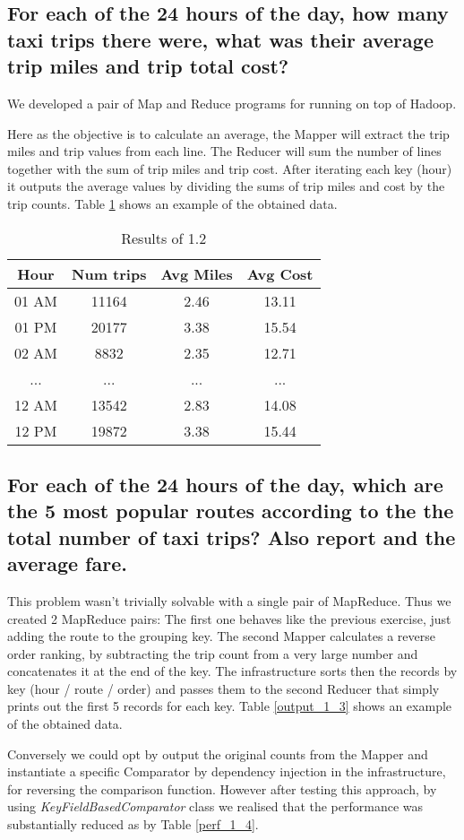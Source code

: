 \documentclass[conference,compsoc]{IEEEtran}
\begin{document}
\subsection{For each of the 24 hours of the day, how many taxi trips there were, what was their average trip miles and trip total cost?}
We developed a pair of Map and Reduce programs for running on top of Hadoop. \par Here as the objective is to calculate an average, the Mapper will extract the trip miles and trip values from each line. The Reducer will sum the number of lines together with the sum of trip miles and trip cost. After iterating each key (hour) it outputs the average values by dividing the sums of trip miles and cost by the trip counts. Table \ref{output_1_2} shows an example of the obtained data.
\begin{table}[!t]
\renewcommand{\arraystretch}{1.3}
\caption{Results of 1.2}
\label{output_1_2}
\centering
\begin{tabular}{c||c|c|c}
\hline
\bfseries Hour & \bfseries Num trips & \bfseries Avg Miles & \bfseries Avg Cost\\
\hline\hline
01 AM&11164&2.46&13.11\\
01 PM&20177&3.38&15.54\\
02 AM&8832&2.35&12.71\\
...&...&...&...\\
12 AM&13542&2.83&14.08\\
12 PM&19872&3.38&15.44\\
\hline
\end{tabular}
\end{table}

\subsection{For each of the 24 hours of the day, which are the 5 most popular routes according to the the total number of taxi trips? Also report and the average fare.}
This problem wasn't trivially solvable with a single pair of MapReduce. Thus we created 2 MapReduce pairs: The first one behaves like the previous exercise, just adding the route to the grouping key. The second Mapper calculates a reverse order ranking, by subtracting the trip count from a very large number and concatenates it at the end of the key. The infrastructure sorts then the records by key (hour / route / order) and passes them to the second Reducer that simply prints out the first 5 records for each key. Table \ref{output_1_3} shows an example of the obtained data. \par Conversely we could opt by output the original counts from the Mapper and instantiate a specific Comparator by dependency injection in the infrastructure, for reversing the comparison function. However after testing this approach, by using \textit{KeyFieldBasedComparator} class we realised that the performance was substantially reduced as by Table \ref{perf_1_4}.
\end{document}

